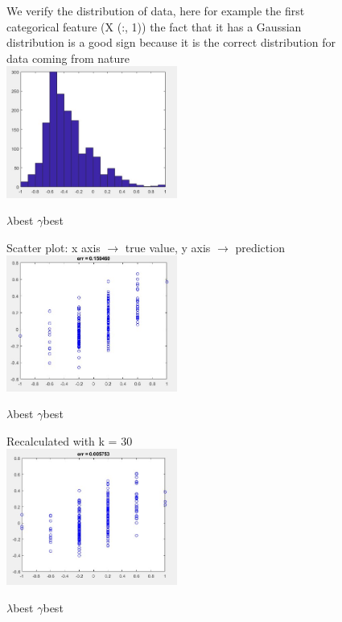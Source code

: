 \begin{figure}
	
	We verify the distribution of data, here for example the first categorical feature (X (:, 1))
	the fact that it has a Gaussian distribution is a good sign because it is the correct distribution for data coming from nature\\
	
	\includegraphics[width=0.5\textwidth]{hist2.png}
	\centering
	\caption{$\lambda$best $\gamma$best}
	
	
\end{figure}

\begin{figure}
	
	Scatter plot: x axis $\rightarrow$ true value, y axis $\rightarrow$ prediction\\
	
	\includegraphics[width=0.5\textwidth]{scatter.png}
	\centering
	\caption{$\lambda$best $\gamma$best}
	
	
\end{figure}

\begin{figure}
	
	Recalculated with k = 30\\
	
	\includegraphics[width=0.5\textwidth]{scatter2.png}
	\centering
	\caption{$\lambda$best $\gamma$best}
	
	
\end{figure}


